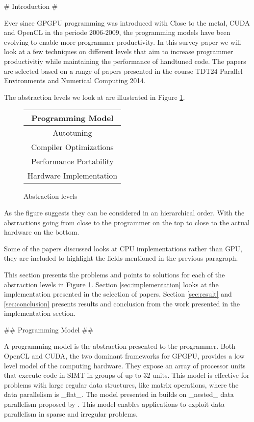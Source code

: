 \begin{markdown}

# Introduction #

Ever since GPGPU programming was introduced with Close to the metal,
CUDA\cite{CUDA} and OpenCL\cite{opencl} in the periode 2006-2009, the
programming models have been evolving to enable more programmer
productivity.  In this survey paper we will look at a few techniques
on different levels that aim to increase programmer productivitiy
while maintaining the performance of handtuned code. The papers are
selected based on a range of papers presented in the course TDT24
Parallel Environments and Numerical Computing 2014.

The abstraction levels we look at are illustrated in Figure
\ref{fig:abstraction}.

\begin{figure}[H]
  \centering
  \begin{tabular}{|c|}
    \hline
    Programming Model \\
    \hline \hline
    Autotuning \\
    \hline \hline
    Compiler Optimizations \\
    \hline \hline
    Performance Portability \\
    \hline \hline
    Hardware Implementation \\
    \hline
  \end{tabular}
  \caption{Abstraction levels}
  \label{fig:abstraction}
\end{figure}

As the figure suggests they can be considered in an hierarchical
order. With the abstractions going from close to the programmer on the
top to close to the actual hardware on the bottom. 

Some of the papers discussed looks at CPU implementations rather than
GPU, they are included to highlight the fields mentioned in the previous
paragraph.

This section presents the problems and points to solutions for each of
the abstraction levels in Figure \ref{fig:abstraction}. Section
\ref{sec:implementation} looks at the implementation presented in the
selection of papers. Section \ref{sec:result} and \ref{sec:conclusion}
presents results and conclusion from the work presented in the
implementation section. 

## Programming Model ##

A programming model is the abstraction presented to the programmer.
Both OpenCL and CUDA, the two dominant frameworks for GPGPU, provides
a low level model of the computing hardware. They expose an array of
processor units that execute code in SIMT in groups of up to 32
units. This model is effective for problems with large regular data
structures, like matrix operations, where the data parallelism is
_flat_. The model presented in \cite{data-para} builds on _nested_
data parallelism proposed by \cite{nesl}. This model enables
applications to exploit data parallelism in sparse and irregular
problems.


\end{markdown}
